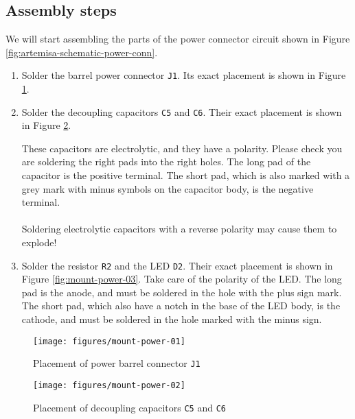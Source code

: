 \subsection{Assembly steps}

We will start assembling the parts of the power connector circuit shown in Figure \ref{fig:artemisa-schematic-power-conn}.

\begin{enumerate}
  \item Solder the barrel power connector {\tt J1}. Its exact placement is shown in Figure \ref{fig:mount-power-01}.
  \item Solder the decoupling capacitors {\tt C5} and {\tt C6}. Their exact placement is shown in Figure \ref{fig:mount-power-02}.

        \begin{warning}
          These capacitors are electrolytic, and they have a polarity. Please check you are soldering the right pads into the right holes. The long pad of the capacitor is the positive terminal. The short pad, which is also marked with a grey mark with minus symbols on the capacitor body, is the negative terminal.\\\\

          Soldering electrolytic capacitors with a reverse polarity may cause them to explode!
        \end{warning}
  \item Solder the resistor {\tt R2} and the LED {\tt D2}. Their exact placement is shown in Figure \ref{fig:mount-power-03}. Take care of the polarity of the LED. The long pad is the anode, and must be soldered in the hole with the plus sign mark. The short pad, which also have a notch in the base of the LED body, is the cathode, and must be soldered in the hole marked with the minus sign.
\end{enumerate}

\begin{figure}[h]
  \centering
  \texttt{[image: figures/mount-power-01]}
  \caption{Placement of power barrel connector {\tt J1}}
  \label{fig:mount-power-01}
\end{figure}

\begin{figure}[h]
  \centering
  \texttt{[image: figures/mount-power-02]}
  \caption{Placement of decoupling capacitors {\tt C5} and {\tt C6}}
  \label{fig:mount-power-02}
\end{figure}

